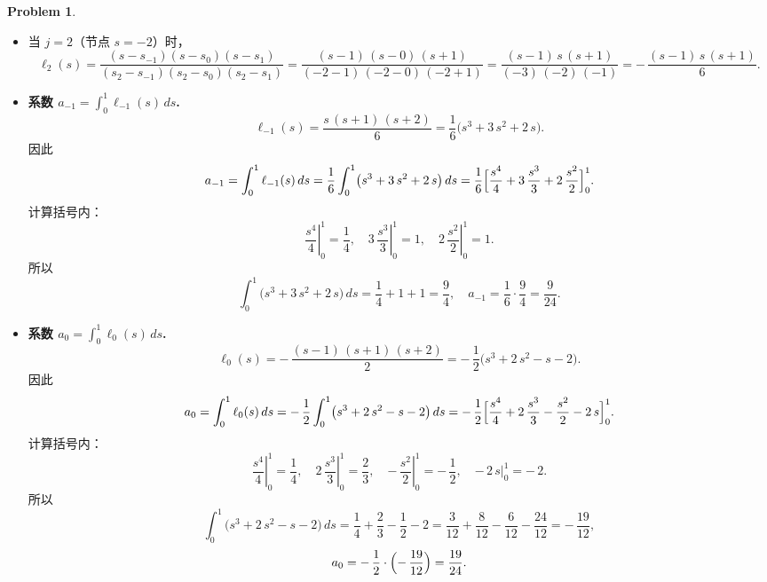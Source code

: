 \documentclass[a4paper]{article}
\theoremstyle{definition}
\newtheorem{problem}{Problem}
\theoremstyle{plain}
\newcommand{\<}{\left<}
\renewcommand{\>}{\right>}
\numberwithin{equation}{problem}
\begin{document}
\begin{problem}
\begin{itemize}
  \item 当 $j = 2$（节点 $s = -2$）时，
    \[
    \ell_{2}(s)
    = \frac{(s - s_{-1})(s - s_{0})(s - s_{1})}
           {(s_{2} - s_{-1})(s_{2} - s_{0})(s_{2} - s_{1})}
    = \frac{(s - 1)\,(s - 0)\,(s + 1)}
           {(-2 - 1)\,(-2 - 0)\,(-2 + 1)}
    = \frac{(s - 1)\,s\,(s + 1)}{(-3)\,(-2)\,(-1)}
    = -\,\frac{(s - 1)\,s\,(s + 1)}{6}.
    \]
\end{itemize}

\medskip



\begin{itemize}
  \item \textbf{系数 $a_{-1} = \displaystyle\int_{0}^{1} \ell_{-1}(s)\,ds$.}  
    \[
    \ell_{-1}(s)
    = \frac{s\,(s + 1)\,(s + 2)}{6}
    = \frac{1}{6}\bigl(s^3 + 3\,s^2 + 2\,s\bigr).
    \]
    因此
    \[
    a_{-1}
    = \int_{0}^{1} \ell_{-1}(s)\,ds
    = \frac{1}{6} \int_{0}^{1} \bigl(s^3 + 3\,s^2 + 2\,s\bigr)\,ds
    = \frac{1}{6} \Bigl[
      \frac{s^4}{4} + 3\,\frac{s^3}{3} + 2\,\frac{s^2}{2}
    \Bigr]_{0}^{1}.
    \]
    计算括号内：
    \[
    \left.\frac{s^4}{4}\right|_{0}^{1} = \frac{1}{4},\quad
    \left.3\,\frac{s^3}{3}\right|_{0}^{1} = 1,\quad
    \left.2\,\frac{s^2}{2}\right|_{0}^{1} = 1.
    \]
    所以
    \[
    \int_{0}^{1} \bigl(s^3 + 3\,s^2 + 2\,s\bigr)\,ds 
    = \frac{1}{4} + 1 + 1 
    = \frac{9}{4},
    \quad
    a_{-1} = \frac{1}{6} \cdot \frac{9}{4} = \frac{9}{24}.
    \]
  
  \item \textbf{系数 $a_{0} = \displaystyle\int_{0}^{1} \ell_{0}(s)\,ds$.}  
    \[
    \ell_{0}(s)
    = -\,\frac{(s - 1)\,(s + 1)\,(s + 2)}{2}
    = -\,\frac{1}{2}\bigl(s^3 + 2\,s^2 - s - 2\bigr).
    \]
    因此
    \[
    a_{0}
    = \int_{0}^{1} \ell_{0}(s)\,ds
    = -\,\frac{1}{2} \int_{0}^{1} \bigl(s^3 + 2\,s^2 - s - 2\bigr)\,ds
    = -\,\frac{1}{2} \Bigl[
      \frac{s^4}{4} + 2\,\frac{s^3}{3} - \frac{s^2}{2} - 2\,s
    \Bigr]_{0}^{1}.
    \]
    计算括号内：
    \[
    \left.\frac{s^4}{4}\right|_{0}^{1} = \frac{1}{4},\quad
    \left.2\,\frac{s^3}{3}\right|_{0}^{1} = \frac{2}{3},\quad
    \left.-\,\frac{s^2}{2}\right|_{0}^{1} = -\,\frac{1}{2},\quad
    \left.-\,2\,s\right|_{0}^{1} = -\,2.
    \]
    所以
    \[
    \int_{0}^{1} \bigl(s^3 + 2\,s^2 - s - 2\bigr)\,ds
    = \frac{1}{4} + \frac{2}{3} - \frac{1}{2} - 2
    = \frac{3}{12} + \frac{8}{12} - \frac{6}{12} - \frac{24}{12}
    = -\,\frac{19}{12},
    \]
    \[
    a_{0} = -\,\frac{1}{2} \cdot \Bigl(-\,\frac{19}{12}\Bigr)
    = \frac{19}{24}.
    \]
  

\end{itemize}
\end{problem}
\end{document}
